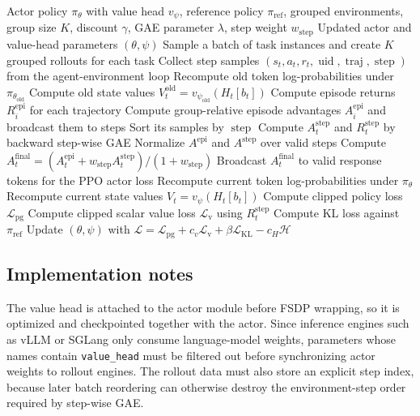 \documentclass[10pt]{article}
\newcommand{\uid}{\operatorname{uid}}
\newcommand{\traj}{\operatorname{traj}}
\newcommand{\step}{\operatorname{step}}
\begin{document}
\begin{algorithm}[t]
\caption{Shared-Backbone Step-wise PPO with Episode-Level Relative Correction}
\label{alg:shared-step-ppo}
\begin{algorithmic}[1]
\Require Actor policy $\pi_\theta$ with value head $v_\psi$, reference policy $\pi_{\mathrm{ref}}$, grouped environments, group size $K$, discount $\gamma$, GAE parameter $\lambda$, step weight $w_{\mathrm{step}}$
\Ensure Updated actor and value-head parameters $(\theta,\psi)$
    \State Sample a batch of task instances and create $K$ grouped rollouts for each task
    \State Collect step samples $(s_t,a_t,r_t,\uid,\traj,\step)$ from the agent-environment loop
    \State Recompute old token log-probabilities under $\pi_{\theta_{\mathrm{old}}}$
    \State Compute old state values $V_t^{\mathrm{old}}=v_{\psi_{\mathrm{old}}}(H_t[b_t])$
    \State Compute episode returns $R_i^{\mathrm{epi}}$ for each trajectory
    \State Compute group-relative episode advantages $A_i^{\mathrm{epi}}$ and broadcast them to steps
        \State Sort its samples by $\step$
        \State Compute $A_t^{\mathrm{step}}$ and $R_t^{\mathrm{step}}$ by backward step-wise GAE
    \EndFor
    \State Normalize $A^{\mathrm{epi}}$ and $A^{\mathrm{step}}$ over valid steps
    \State Compute $A_t^{\mathrm{final}}=(A_t^{\mathrm{epi}}+w_{\mathrm{step}}A_t^{\mathrm{step}})/(1+w_{\mathrm{step}})$
    \State Broadcast $A_t^{\mathrm{final}}$ to valid response tokens for the PPO actor loss
        \State Recompute current token log-probabilities under $\pi_\theta$
        \State Recompute current state values $V_t=v_\psi(H_t[b_t])$
        \State Compute clipped policy loss $\mathcal{L}_{\mathrm{pg}}$
        \State Compute clipped scalar value loss $\mathcal{L}_{\mathrm{v}}$ using $R_t^{\mathrm{step}}$
        \State Compute KL loss against $\pi_{\mathrm{ref}}$
        \State Update $(\theta,\psi)$ with $\mathcal{L}=\mathcal{L}_{\mathrm{pg}}+c_v\mathcal{L}_{\mathrm{v}}+\beta\mathcal{L}_{\mathrm{KL}}-c_H\mathcal{H}$
    \EndFor
\EndFor
\end{algorithmic}
\end{algorithm}

\subsection*{Implementation notes}

The value head is attached to the actor module before FSDP wrapping, so it is optimized and checkpointed together with the actor. Since inference engines such as vLLM or SGLang only consume language-model weights, parameters whose names contain \texttt{value\_head} must be filtered out before synchronizing actor weights to rollout engines. The rollout data must also store an explicit step index, because later batch reordering can otherwise destroy the environment-step order required by step-wise GAE.
\end{document}
